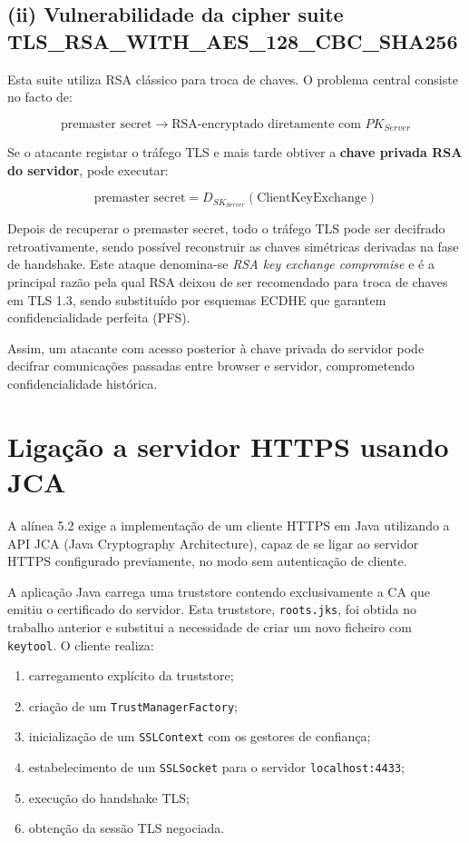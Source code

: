 \subsection{(ii) Vulnerabilidade da cipher suite TLS\_RSA\_WITH\_AES\_128\_CBC\_SHA256}

Esta suite utiliza RSA clássico para troca de chaves. O problema central consiste no facto de:

\[
\text{premaster secret} \longrightarrow \text{RSA-encryptado diretamente com } PK_{Server}
\]

Se o atacante registar o tráfego TLS e mais tarde obtiver a \textbf{chave privada RSA do servidor}, pode executar:

\[
\text{premaster secret} = D_{SK_{Server}}(\text{ClientKeyExchange})
\]

Depois de recuperar o premaster secret, todo o tráfego TLS pode ser decifrado retroativamente, sendo possível reconstruir as chaves simétricas derivadas na fase de handshake. Este ataque denomina-se \textit{RSA key exchange compromise} e é a principal razão pela qual RSA deixou de ser recomendado para troca de chaves em TLS 1.3, sendo substituído por esquemas ECDHE que garantem confidencialidade perfeita (PFS).

Assim, um atacante com acesso posterior à chave privada do servidor pode decifrar comunicações passadas entre browser e servidor, comprometendo confidencialidade histórica.

\section{Ligação a servidor HTTPS usando JCA}

A alínea 5.2 exige a implementação de um cliente HTTPS em Java utilizando a API JCA (Java Cryptography Architecture), capaz de se ligar ao servidor HTTPS configurado previamente, no modo sem autenticação de cliente.

A aplicação Java carrega uma truststore contendo exclusivamente a CA que emitiu o certificado do servidor. Esta truststore, \texttt{roots.jks}, foi obtida no trabalho anterior e substitui a necessidade de criar um novo ficheiro com \texttt{keytool}. O cliente realiza:

\begin{enumerate}
    \item carregamento explícito da truststore;
    \item criação de um \texttt{TrustManagerFactory};
    \item inicialização de um \texttt{SSLContext} com os gestores de confiança;
    \item estabelecimento de um \texttt{SSLSocket} para o servidor \texttt{localhost:4433};
    \item execução do handshake TLS;
    \item obtenção da sessão TLS negociada.
\end{enumerate}

